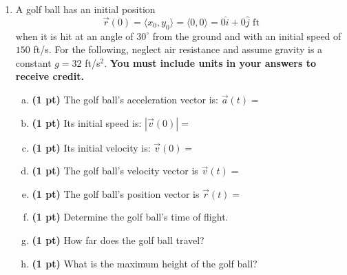 \documentclass[12pt]{article}
\begin{document}
\begin{enumerate}[1.]
\newpage
\item A golf ball has an initial position 
\[
\overrightarrow{r}(0)=\langle x_0,y_0\rangle = \langle 0,0\rangle = 0\hat i + 0\hat j \text{ ft}
\]
when it is hit at an angle of $30^{\circ}$ from the ground and with an initial speed of $150$ ft/s.  For the following, neglect air resistance and assume gravity is a constant $g=32$ ft/s$^2$.  {\bf You must include units in your answers to receive credit.}
	\begin{enumerate}[(a)]
	\item {\bf (1 pt)} The golf ball's acceleration vector is: $\overrightarrow{a}(t)=$
	\vspace{1pc} 
	\item {\bf (1 pt)} Its initial speed is: $|\overrightarrow{v}(0)|=$
	\vspace{1pc}
	\item {\bf (1 pt)} Its initial velocity is: $\overrightarrow{v}(0)=$
	\vspace{3pc}
	\item {\bf (1 pt)} The golf ball's velocity vector is $\overrightarrow{v}(t)=$
	\vspace{5pc}
	\item {\bf (1 pt)} The golf ball's position vector is $\overrightarrow{r}(t)=$
	\vspace{5pc}
	\item {\bf (1 pt)} Determine the golf ball's time of flight.
	\vspace{5pc}
	\item {\bf (1 pt)} How far does the golf ball travel?
	\vspace{2pc}
	\item {\bf (1 pt)} What is the maximum height of the golf ball? 
	\end{enumerate}
\end{enumerate}
\end{document}
